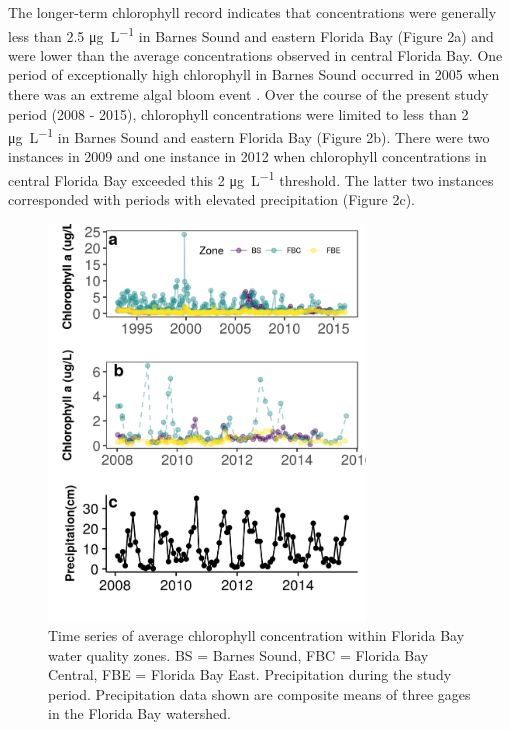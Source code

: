 The longer-term chlorophyll record indicates that concentrations were generally less than 2.5 \si{\micro\gram\per\liter} in Barnes Sound and eastern Florida Bay (Figure 2a) and were lower than the average concentrations observed in central Florida Bay. One period of exceptionally high chlorophyll in Barnes Sound occurred in 2005 when there was an extreme algal bloom event \citep{rudnick_2006}. Over the course of the present study period (2008 - 2015), chlorophyll concentrations were limited to less than 2 \si{\micro\gram\per\liter} in Barnes Sound and eastern Florida Bay (Figure 2b). There were two instances in 2009 and one instance in 2012 when chlorophyll concentrations in central Florida Bay exceeded this 2 \si{\micro\gram\per\liter} threshold. The latter two instances corresponded with periods with elevated precipitation (Figure 2c).

\begin{figure}
  \centering
  \includegraphics[width=0.75\textwidth]{../../figures/chltimeseries.png}
  \caption{Time series of average chlorophyll concentration within Florida Bay water quality zones. BS = Barnes Sound, FBC = Florida Bay Central, FBE = Florida Bay East. Precipitation during the study period. Precipitation data shown are composite means of three gages in the Florida Bay watershed.}
  \label{fig:2}
\end{figure}

